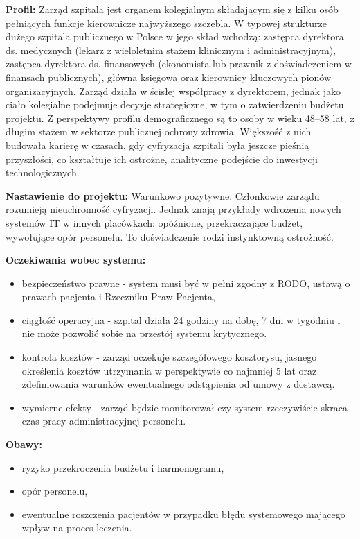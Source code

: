 \textbf{Profil:} Zarząd szpitala jest organem kolegialnym składającym się z kilku osób pełniących funkcje kierownicze najwyższego szczebla. W typowej strukturze dużego szpitala publicznego w Polsce w jego skład wchodzą: zastępca dyrektora ds. medycznych (lekarz z wieloletnim stażem klinicznym i administracyjnym), zastępca dyrektora ds. finansowych (ekonomista lub prawnik z doświadczeniem w finansach publicznych), główna księgowa oraz kierownicy kluczowych pionów organizacyjnych. Zarząd działa w ścisłej współpracy z dyrektorem, jednak jako ciało kolegialne podejmuje decyzje strategiczne, w tym o zatwierdzeniu budżetu projektu.
Z perspektywy profilu demograficznego są to osoby w wieku 48–58 lat, z długim stażem w sektorze publicznej ochrony zdrowia. Większość z nich budowała karierę w czasach, gdy cyfryzacja szpitali była jeszcze pieśnią przyszłości, co kształtuje ich ostrożne, analityczne podejście do inwestycji technologicznych.

\textbf{Nastawienie do projektu:} Warunkowo pozytywne. Członkowie zarządu rozumieją nieuchronność cyfryzacji. Jednak znają przykłady wdrożenia nowych systemów IT w innych placówkach: opóźnione, przekraczające budżet, wywołujące opór personelu. To doświadczenie rodzi instynktowną ostrożność.

\textbf{Oczekiwania wobec systemu:}
\begin{itemize}
    \item bezpieczeństwo prawne - system musi być w pełni zgodny z RODO, ustawą o prawach pacjenta i Rzeczniku Praw Pacjenta,
    \item ciągłość operacyjna - szpital działa 24 godziny na dobę, 7 dni w tygodniu i nie może pozwolić sobie na przestój systemu krytycznego.
    \item kontrola kosztów - zarząd oczekuje szczegółowego kosztorysu, jasnego określenia kosztów utrzymania w perspektywie co najmniej 5 lat oraz zdefiniowania warunków ewentualnego odstąpienia od umowy z dostawcą.
    \item wymierne efekty - zarząd będzie monitorował czy system rzeczywiście skraca czas pracy administracyjnej personelu.
\end{itemize}

\textbf{Obawy:}
\begin{itemize}
    \item ryzyko przekroczenia budżetu i harmonogramu,
    \item opór personelu,
    \item ewentualne roszczenia pacjentów w przypadku błędu systemowego mającego wpływ na proces leczenia.
\end{itemize}

